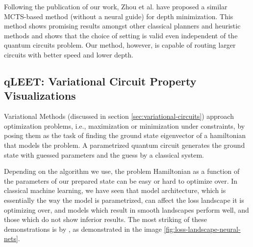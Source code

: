 Following the publication of our work, Zhou et al. \cite{qroute_mcts} have proposed a similar MCTS-based method (without a neural guide) for depth minimization. This method shows promising results amongst other classical planners and heuristic methods and shows that the choice of setting is valid even independent of the quantum circuits problem. Our method, however, is capable of routing larger circuits with better speed and lower depth.

\subsection{qLEET: Variational Circuit Property Visualizations}

Variational Methods (discussed in section \ref{sec:variational-circuits}) approach optimization problems, i.e., maximization or minimization under constraints, by posing them as the task of finding the ground state eigenvector of a hamiltonian that models the problem. A parametrized quantum circuit generates the ground state with guessed parameters and the guess by a classical system.

Depending on the algorithm we use, the problem Hamiltonian as a function of the parameters of our prepared state can be easy or hard to optimize over. In classical machine learning, we have seen that model architecture, which is essentially the way the model is parametrized, can affect the loss landscape it is optimizing over, and models which result in smooth landscapes perform well, and those which do not show inferior results. The most striking of these demonstrations is by \cite{loss-landscapes}, as demonstrated in the image \ref{fig:loss-landscape-neural-nets}. 

